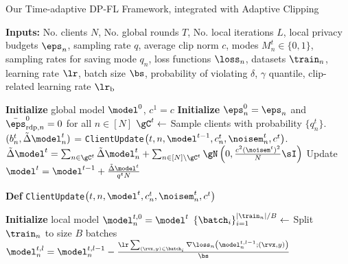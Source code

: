 \begin{minipage}{0.47\textwidth} 

\end{minipage}%
\hspace{1em} 
\begin{minipage}{0.50\textwidth}  %
  \raggedright  %
 \begin{algorithm}[H]
   \scriptsize
\caption{Our Time-adaptive DP-FL Framework, integrated with Adaptive Clipping}
\textbf{Inputs:} No. clients $N$, No. global rounds $T$, No. local iterations $L$, local privacy budgets $\eps_n$, sampling rate $q$, average clip norm $c$, modes $M_n^t \in\{0,1\}$, sampling rates for saving mode $q_n$, loss functions $\loss_n$, datasets $\train_n$, learning rate $\lr$, batch size $\bs$, probability of violating $\delta$, $\gamma$ quantile, clip-related learning rate $\lr_\text{b}$ \\ 
\label{alg:tidpfl:train}
\begin{algorithmic}[1]
\State \textbf{Initialize} global model $\model^0$, $c^1 = c$
\State \textbf{Initialize} $\eps_n^0 = \eps_n$  and $\bar{\eps}_{\text{rdp},n}^0=0$ for all $n\in [N]$
\State {}
\State $\gC^t \gets$ Sample clients with probability $\{q_n^t\}$.
\State $(b_n^t,\tilde{\Delta}\model_n^t)$ =  
\texttt{ClientUpdate}$\left(t, n,\model^{t-1}, c_n^t, \noisem_n^t, c^t\right)$.
\State
\EndFor
\State $\tilde{\Delta}\model^t = \sum_{n\in \gC^t} \tilde{\Delta}\model_n^t +  \sum_{n\in  [N]\backslash \gC^t} \gN\left(0,\frac{c^2(\noisem^t)^2}{N}\sI\right)$
\State Update $\model^{t} = \model^{t-1} + \frac{\tilde{\Delta}\model^t}{q^tN}$
\State {}
\EndFor
\Statex
\end{algorithmic}
\textbf{Def} \texttt{ClientUpdate}$\left(t, n,\model^{t}, c_n^t, \noisem_n^t, c^t\right)$
\begin{algorithmic}[1]
\State \textbf{Initialize} local model $\model_n^{t,0}=\model^t$
\State $\{\batch_i\}_{i=1}^{|\train_n|/B} \gets$ Split $\train_n$ to size $B$ batches
\State $\model_n^{t,l} = \model_n^{t,l-1}-\frac{\lr \sum_{(\rvx,y)\in \batch_i} \nabla\loss_n\left(\model_n^{t,l-1};(\rvx,y)\right)}{\bs}$

\end{algorithmic}
\end{algorithm}
\end{minipage}
